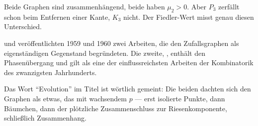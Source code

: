 \begin{aufgabe}
Beide Graphen sind zusammenhängend, beide haben $\mu_2 > 0$. Aber $P_3$ zerfällt schon beim Entfernen einer Kante, $K_3$ nicht. Der Fiedler-Wert misst genau diesen Unterschied.

\begin{center}
\begin{minipage}{0.86\textwidth}
\end{minipage}
\end{center}
\end{aufgabe}

\begin{geschichte}
 und  veröffentlichten 1959 und 1960 zwei Arbeiten, die den Zufallsgraphen als eigenständigen Gegenstand begründeten. Die zweite, , enthält den Phasenübergang und gilt als eine der einflussreichsten Arbeiten der Kombinatorik des zwanzigsten Jahrhunderts.

Das Wort \enquote{Evolution} im Titel ist wörtlich gemeint: Die beiden dachten sich den Graphen als etwas, das mit wachsendem $p$  --- erst isolierte Punkte, dann Bäumchen, dann der plötzliche Zusammenschluss zur Riesenkomponente, schließlich Zusammenhang.

\begin{center}
\begin{minipage}{0.9\textwidth}
\end{minipage}
\end{center}
\end{geschichte}

